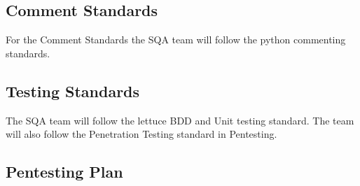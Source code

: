 \documentclass{report}
\begin{document}
\subsection{Comment Standards}
For the Comment Standards the SQA team will follow the python commenting standards.

\subsection{Testing Standards}
The SQA team will follow the lettuce BDD and Unit testing standard. The team will also follow the Penetration Testing standard in Pentesting.

\subsection{Pentesting Plan}



\newpage
\end{document}
